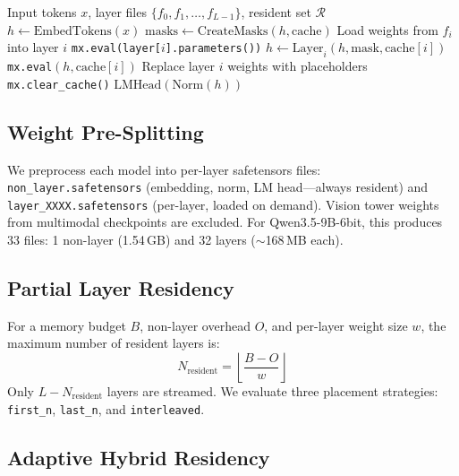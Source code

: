\documentclass[10pt,a4paper]{article}
\begin{document}
\begin{algorithm}[h]
\caption{Layer-Streaming Forward Pass}
\label{alg:streaming}
\begin{algorithmic}[1]
\REQUIRE Input tokens $x$, layer files $\{f_0, f_1, \ldots, f_{L-1}\}$, resident set $\mathcal{R}$
\STATE $h \leftarrow \text{EmbedTokens}(x)$ 
\STATE $\text{masks} \leftarrow \text{CreateMasks}(h, \text{cache})$
        \STATE Load weights from $f_i$ into layer $i$ 
        \STATE \texttt{mx.eval(layer[$i$].parameters())}
    \ENDIF
    \STATE $h \leftarrow \text{Layer}_i(h, \text{mask}, \text{cache}[i])$
    \STATE \texttt{mx.eval}$(h, \text{cache}[i])$ 
        \STATE Replace layer $i$ weights with placeholders
        \STATE \texttt{mx.clear\_cache()}
    \ENDIF
\ENDFOR
\STATE \RETURN $\text{LMHead}(\text{Norm}(h))$
\end{algorithmic}
\end{algorithm}

\subsection{Weight Pre-Splitting}

We preprocess each model into per-layer safetensors files: \texttt{non\_layer.safetensors} (embedding, norm, LM head---always resident) and \texttt{layer\_XXXX.safetensors} (per-layer, loaded on demand). Vision tower weights from multimodal checkpoints are excluded. For Qwen3.5-9B-6bit, this produces 33 files: 1 non-layer (1.54\,GB) and 32 layers ($\sim$168\,MB each).

\subsection{Partial Layer Residency}

For a memory budget $B$, non-layer overhead $O$, and per-layer weight size $w$, the maximum number of resident layers is:
\begin{equation}
    N_{\text{resident}} = \left\lfloor \frac{B - O}{w} \right\rfloor
\end{equation}
Only $L - N_{\text{resident}}$ layers are streamed. We evaluate three placement strategies: \texttt{first\_n}, \texttt{last\_n}, and \texttt{interleaved}.

\subsection{Adaptive Hybrid Residency}
\end{document}
